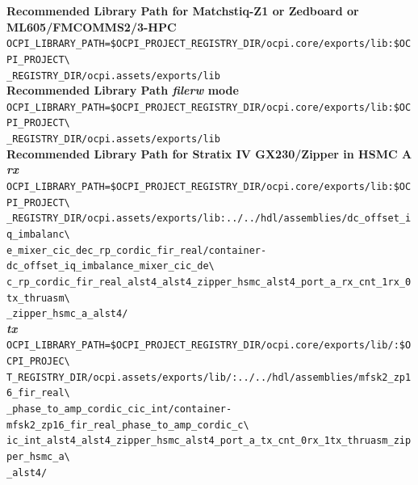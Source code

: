 \noindent\textbf{Recommended Library Path for Matchstiq-Z1 or Zedboard or ML605/FMCOMMS2/3-HPC}\\
\verb|OCPI_LIBRARY_PATH=$OCPI_PROJECT_REGISTRY_DIR/ocpi.core/exports/lib:$OCPI_PROJECT\| \\
\verb|_REGISTRY_DIR/ocpi.assets/exports/lib| \\

\noindent\textbf{Recommended Library Path \textit{filerw} mode}\\
\verb|OCPI_LIBRARY_PATH=$OCPI_PROJECT_REGISTRY_DIR/ocpi.core/exports/lib:$OCPI_PROJECT\| \\
\verb|_REGISTRY_DIR/ocpi.assets/exports/lib| \\

\noindent\textbf{Recommended Library Path for Stratix IV GX230/Zipper in HSMC A}\\
\noindent\textbf{\textit{rx}}\\
\verb|OCPI_LIBRARY_PATH=$OCPI_PROJECT_REGISTRY_DIR/ocpi.core/exports/lib:$OCPI_PROJECT\| \\
\verb|_REGISTRY_DIR/ocpi.assets/exports/lib:../../hdl/assemblies/dc_offset_iq_imbalanc\| \\
\verb|e_mixer_cic_dec_rp_cordic_fir_real/container-dc_offset_iq_imbalance_mixer_cic_de\| \\
\verb|c_rp_cordic_fir_real_alst4_alst4_zipper_hsmc_alst4_port_a_rx_cnt_1rx_0tx_thruasm\| \\
\verb|_zipper_hsmc_a_alst4/| \\

\noindent\textbf{\textit{tx}}\\
\verb|OCPI_LIBRARY_PATH=$OCPI_PROJECT_REGISTRY_DIR/ocpi.core/exports/lib/:$OCPI_PROJEC\| \\
\verb|T_REGISTRY_DIR/ocpi.assets/exports/lib/:../../hdl/assemblies/mfsk2_zp16_fir_real\| \\
\verb|_phase_to_amp_cordic_cic_int/container-mfsk2_zp16_fir_real_phase_to_amp_cordic_c\| \\
\verb|ic_int_alst4_alst4_zipper_hsmc_alst4_port_a_tx_cnt_0rx_1tx_thruasm_zipper_hsmc_a\| \\
\verb|_alst4/| \\

